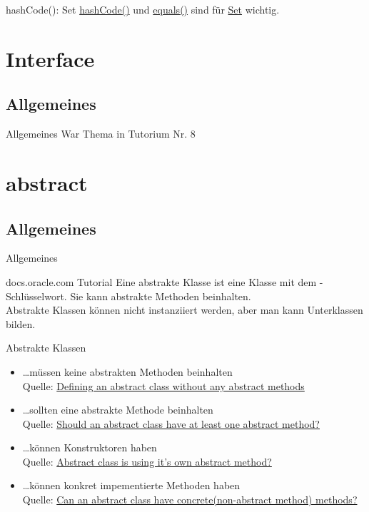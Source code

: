 \documentclass[usepdftitle=false,hyperref={pdfpagelabels=false}]{beamer}
\begin{document}
\begin{frame}{hashCode(): Set}
    \href{http://docs.oracle.com/javase/7/docs/api/java/lang/Object.html\#equals(java.lang.Object)}{hashCode()} und \href{http://docs.oracle.com/javase/7/docs/api/java/lang/Object.html\#equals(java.lang.Object)}{equals()} sind für \href{http://docs.oracle.com/javase/7/docs/api/java/util/Set.html}{Set} wichtig.
\end{frame}

\section{Interface}
\subsection{Allgemeines}
\begin{frame}{Allgemeines}
    War Thema in Tutorium Nr. 8
\end{frame}

\section{abstract}
\subsection{Allgemeines}
\begin{frame}{Allgemeines}
    \begin{block}{docs.oracle.com Tutorial}
        Eine abstrakte Klasse ist eine Klasse mit dem -Schlüsselwort.
        Sie kann abstrakte Methoden beinhalten.\\
        Abstrakte Klassen können nicht instanziiert werden, aber man kann
        Unterklassen bilden.
    \end{block}

    Abstrakte Klassen 
    \begin{itemize}[<+->]
        \item \dots müssen keine abstrakten Methoden beinhalten\\
              {\tiny Quelle: \href{http://stackoverflow.com/q/4811678/562769}{Defining an abstract class without any abstract methods}}
        \item \dots sollten eine abstrakte Methode beinhalten\\
              {\tiny Quelle: \href{http://stackoverflow.com/q/2283399/562769}{Should an abstract class have at least one abstract method?}}
        \item \dots können Konstruktoren haben\\
              {\tiny Quelle: \href{http://stackoverflow.com/q/7644342/562769}{Abstract class is using it's own abstract method?}}
        \item \dots können konkret impementierte Methoden haben\\
              {\tiny Quelle: \href{http://answers.yahoo.com/question/index?qid=20111207141904AABXAvh}{Can an abstract class have concrete(non-abstract method) methods?}}
    \end{itemize}
\end{frame}
\end{document}

